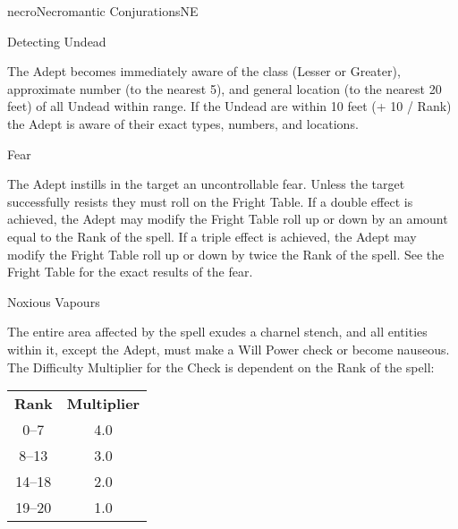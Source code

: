 \begin{college}[1.1]{necro}{Necromantic Conjurations}{NE}
\begin{spell}[G-4]{Detecting Undead}

\begin{effects}
The Adept becomes immediately aware of the class (Lesser or Greater),
approximate number (to the nearest 5), and general location (to the
nearest 20 feet) of all Undead within range.  If the Undead are within
10 feet (+ 10 / Rank) the Adept is aware of their exact types,
numbers, and locations.
\end{effects}
\end{spell}

\begin{spell}[G-5]{Fear}

\begin{effects}
The Adept instills in the target an uncontrollable fear.  Unless the
target successfully resists they must roll on the Fright Table.  If a
double effect is achieved, the Adept may modify the Fright Table roll
up or down by an amount equal to the Rank of the spell. If a triple
effect is achieved, the Adept may modify the Fright Table roll up or
down by twice the Rank of the spell.  See the Fright Table for the
exact results of the fear.
\end{effects}
\end{spell}

\begin{spell}[G-6]{Noxious Vapours}

\begin{effects}
The entire area affected by the spell exudes a charnel stench, and all
entities within it, except the Adept, must make a Will Power check or
become nauseous.  The Difficulty Multiplier for the Check is dependent
on the Rank of the spell:

\begin{tabular}{cc}
\textbf{Rank} & \textbf{Multiplier} \\
0--7 	& 4.0 \\
8--13	& 3.0 \\
14--18	& 2.0 \\
19--20  & 1.0 \\
\end{tabular}


\end{effects}
\end{spell}
\end{college}
